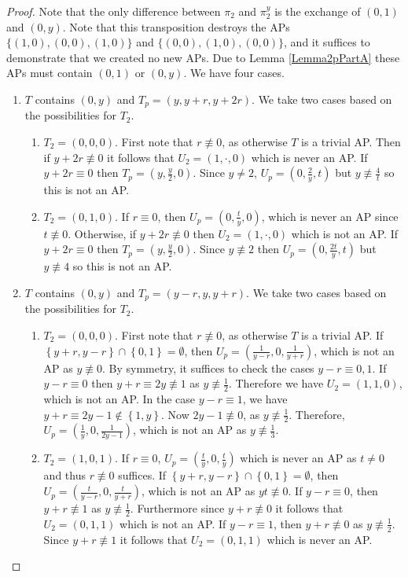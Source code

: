 \documentclass[12pt]{amsart}
\theoremstyle{definition}
\theoremstyle{remark}
\begin{document}
 \begin{proof}
 Note that the only difference between $\pi_2$ and $\pi_2^y$ is the exchange of $(0,1)$ and $(0,y)$. Note that this transposition destroys the APs $\{(1,0),(0,0),(1,0)\}$ and $\{(0,0),(1,0),(0,0)\}$, and it suffices to demonstrate that we created no new APs. Due to Lemma \ref{Lemma2pPartA} these APs must contain $(0,1)$ or $(0,y)$. We have four cases.
 \begin{enumerate}
 \item $T$ contains $(0,y)$ and $T_p=(y, y+r, y+2r)$. We take two cases based on the possibilities for $T_2$.
 \begin{enumerate}
 \item $T_2=(0, 0, 0)$. First note that $r\nequiv 0$, as otherwise $T$ is a trivial AP. Then if $y+2r\nequiv 0$ it follows that $U_2=(1,\cdot,0)$ which is never an AP. If $y+2r\equiv 0$ then $T_p=(y,\frac{y}{2},0).$ Since $y\neq 2$, $U_p=(0,\frac{2}{y},t)$ but $y\nequiv \frac{4}{t}$ so this is not an AP.
 \item $T_2=(0, 1, 0)$. If $r\equiv 0$, then $U_p=(0, \frac{t}{y}, 0)$, which is never an AP since $t\nequiv 0$. Otherwise, if $y+2r\nequiv0$ then $U_2=(1,\cdot,0)$ which is not an AP. If $y+2r\equiv 0$ then $T_p=(y,\frac{y}{2},0).$ Since $y\nequiv 2$ then $U_p=(0,\frac{2t}{y},t)$ but $y\nequiv 4$ so this is not an AP.
 \end{enumerate}
  \item $T$ contains $(0,y)$ and $T_p=(y-r, y, y+r)$. We take two cases based on the possibilities for $T_2$.
 \begin{enumerate}
 \item $T_2=(0, 0, 0)$. First note that $r\nequiv 0$, as otherwise $T$ is a trivial AP. If $\left\{y+r, y-r\right\}\cap \left\{0, 1\right\}=\emptyset$, then $U_p=(\frac{1}{y-r}, 0, \frac{1}{y+r})$, which is not an AP as $y\nequiv 0$. By symmetry, it suffices to check the cases $y-r\equiv 0, 1$. If $y-r\equiv0$ then $y+r\equiv2y\nequiv 1$ as $y\nequiv \frac{1}{2}$. Therefore we have $U_2=(1, 1, 0)$, which is not an AP. In the case $y-r\equiv1$, we have $y+r\equiv2y-1\notin\left\{1, y\right\}$. Now $2y-1\nequiv 0$, as $y\nequiv \frac{1}{2}$. Therefore, $U_p=(\frac{1}{y},0, \frac{1}{2y-1})$, which is not an AP as $y\nequiv \frac{1}{3}$. 
 \item $T_2=(1, 0, 1)$. If $r\equiv 0$, $U_p=(\frac{t}{y},0,\frac{t}{y})$ which is never an AP as $t\neq 0$ and thus $r\nequiv 0$ suffices. If $\left\{y+r, y-r\right\}\cap \left\{0, 1\right\}=\emptyset$, then $U_p=(\frac{t}{y-r}, 0, \frac{t}{y+r})$, which is not an AP as $yt\nequiv 0$. If $y-r\equiv 0$, then $y+r\nequiv 1$ as $y\nequiv \frac{1}{2}$. Furthermore since $y+r\nequiv 0$ it follows that $U_2=(0,1,1)$ which is not an AP. If $y-r\equiv 1$, then $y+r\nequiv 0$ as $y\nequiv\frac{1}{2}$. Since $y+r\nequiv 1$ it follows that $U_2=(0,1,1)$ which is never an AP. 

\end{enumerate}
\end{enumerate}
\end{proof}
\end{document}
